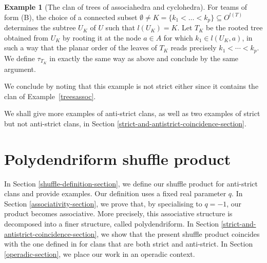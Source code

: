 \documentclass{article}
\theoremstyle{plain}
\theoremstyle{definition}
\newtheorem{example}[thm]{\sc Example}
\begin{document}
\begin{example}[The clan of trees of associahedra and cyclohedra]
 For teams of form (B),    the choice of a connected subset $\emptyset\neq K=\{k_1<\dots<k_p\}\subseteq O^{l(T)}$ determines the subtree $U_K$ of $U$ such that $l(U_K)=K$. Let $T_{K}$ be the rooted tree obtained from $U_K$ by rooting it at the node $a\in A$ for which $k_1\in l(U_K,a)$, in such a way that the  planar order of the leaves of $T_K$ reads precisely $k_1<\cdots <k_p$. We define $\tau_{T_K}$ in exactly the same way as above and conclude by the same argument.
 
 We conclude by noting that this example is not strict either since it contains the clan of Example~\ref{treesassoc}.
\end{example}

 
 We shall give more examples of anti-strict clans, as well as two examples of strict but not anti-strict clans, in Section \ref{strict-and-antistrict-coincidence-section}.





\section{Polydendriform shuffle product} \label{shuffle-section}
In Section \ref{shuffle-definition-section}, we  define our shuffle product for anti-strict clans and provide examples. Our definition uses a fixed real parameter $q$. In Section \ref{associativity-section}, we prove that,  by specialising to $q=-1$,  our product becomes  associative. More precisely, this associative structure is decomposed into a finer structure, called polydendriform.
In Section \ref{strict-and-antistrict-coincidence-section}, we show that the present shuffle product coincides with the one defined in \cite{PLBJ1} for clans that are both strict and anti-strict. {In Section \ref{operadic-section}, we place our work  in an operadic context.}
\end{document}
